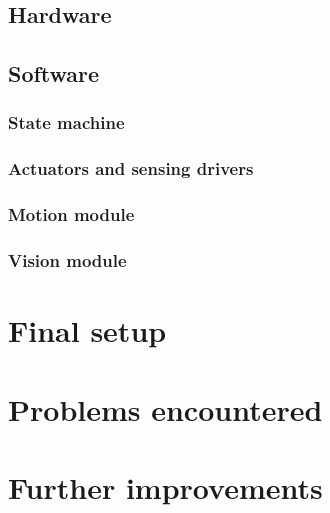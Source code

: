 \documentclass[11pt]{article}
\begin{document}
\subsection{Hardware}
	
	
\subsection{Software}



\subsubsection{State machine}



\subsubsection{Actuators and sensing drivers}


\subsubsection{Motion module}


\subsubsection{Vision module}


\section{ Final setup }


\section{Problems encountered}




\section{Further improvements}
\label{sec:future-improvements}




\printbibliography
\end{document}
